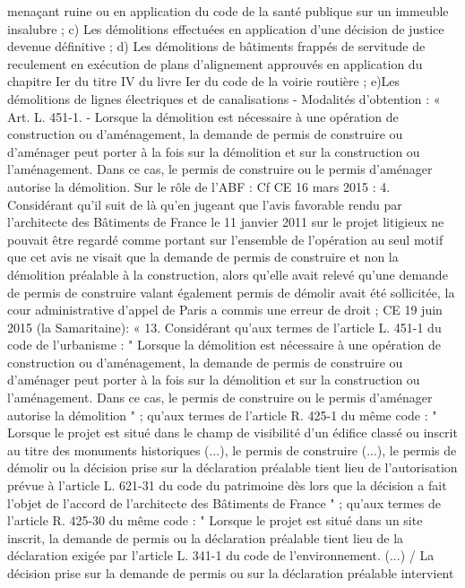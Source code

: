 \documentclass[11pt,a4paper]{report}
\begin{document}
	menaçant ruine ou en application du code de la santé publique sur un immeuble insalubre ;
	c) Les démolitions effectuées en application d'une décision de justice devenue définitive ;
	d) Les démolitions de bâtiments frappés de servitude de reculement en exécution de plans d'alignement approuvés
	en application du chapitre Ier du titre IV du livre Ier du code de la voirie routière ;
	e)Les démolitions de lignes électriques et de canalisations
	- Modalités d’obtention : « Art. L. 451-1. - Lorsque la démolition est nécessaire à une opération de
	construction ou d'aménagement, la demande de permis de construire ou d'aménager peut porter à la fois sur la
	démolition et sur la construction ou l'aménagement. Dans ce cas, le permis de construire ou le permis
	d'aménager autorise la démolition.
	Sur le rôle de l’ABF : Cf CE 16 mars 2015  : 4. Considérant qu'il suit de là qu'en jugeant que l'avis
	favorable rendu par l'architecte des Bâtiments de France le 11 janvier 2011 sur le projet litigieux ne pouvait
	être regardé comme portant sur l'ensemble de l'opération au seul motif que cet avis ne visait que la demande de
	permis de construire et non la démolition préalable à la construction, alors qu'elle avait relevé qu'une demande
	de permis de construire valant également permis de démolir avait été sollicitée, la cour administrative d'appel
	de Paris a commis une erreur de droit ;
	CE 19 juin 2015  (la Samaritaine): « 13. Considérant qu'aux termes de l'article L. 451-1 du code de
	l'urbanisme : " Lorsque la démolition est nécessaire à une opération de construction ou d'aménagement, la
	demande de permis de construire ou d'aménager peut porter à la fois sur la démolition et sur la construction ou
	l'aménagement. Dans ce cas, le permis de construire ou le permis d'aménager autorise la démolition " ; qu'aux
	termes de l'article R. 425-1 du même code : " Lorsque le projet est situé dans le champ de visibilité d'un édifice
	classé ou inscrit au titre des monuments historiques (...), le permis de construire (...), le permis de démolir ou la
	décision prise sur la déclaration préalable tient lieu de l'autorisation prévue à l'article L. 621-31 du code du
	patrimoine dès lors que la décision a fait l'objet de l'accord de l'architecte des Bâtiments de France " ; qu'aux
	termes de l'article R. 425-30 du même code : " Lorsque le projet est situé dans un site inscrit, la demande de
	permis ou la déclaration préalable tient lieu de la déclaration exigée par l'article L. 341-1 du code de
	l'environnement. (...) / La décision prise sur la demande de permis ou sur la déclaration préalable intervient
\end{document}

